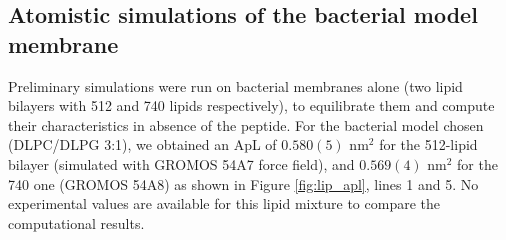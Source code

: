 \subsection{Atomistic simulations of the bacterial model membrane} \label{sec:lip_atom_bact}

Preliminary simulations were run on bacterial membranes alone (two lipid bilayers with 512 and 740 lipids respectively), to equilibrate them and compute their characteristics in absence of the peptide.
%
For the bacterial model chosen (DLPC/DLPG 3:1), we obtained an ApL of $0.580(5)$ nm$^2$ for the 512-lipid bilayer (simulated with GROMOS 54A7 force field), and  $0.569(4)$ nm$^2$ for the 740 one (GROMOS 54A8) as shown in Figure \ref{fig:lip_apl}, lines 1 and 5. No experimental values are available for this lipid mixture to compare the computational results.

